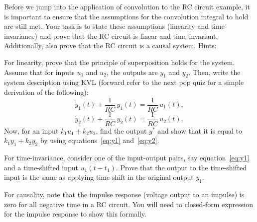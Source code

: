 \documentclass{ee102_notes}
\begin{document}
\begin{popquiz}
    Before we jump into the application of convolution to the RC circuit example, it is important to ensure that the assumptions for the convolution integral to hold are still met. Your task is to state these assumptions (linearity and time-invariance) and prove that the RC circuit is linear and time-invariant. Additionally, also prove that the RC circuit is a causal system.
    \popqsplit
    Hints:
    
    For linearity, prove that the principle of superposition holds for the system. Assume that for inputs $u_1$ and $u_2$, the outputs are $y_1$ and $y_2$. 
    Then, write the system description using KVL (forward refer to the next pop quiz for a simple derivation of the following):
    \begin{equation}
        \label{eq:y1}
    \dot y_1(t)+\frac{1}{RC}\,y_1(t)=\frac{1}{RC}\,u_1(t),
    \end{equation}
    \begin{equation}
    \dot y_2(t)+\frac{1}{RC}\,y_2(t)=\frac{1}{RC}\,u_2(t),
    \label{eq:y2}
    \end{equation}
    Now, for an input $k_1u_1 + k_2u_2$, find the output $y^*$ and show that it is equal to $k_1y_1 + k_2y_2$ by using equations~\eqref{eq:y1} and~\eqref{eq:y2}. 

    For time-invariance, consider one of the input-output pairs, say equation~\eqref{eq:y1} and a time-shifted input $u_1(t - t_1)$. Prove that the output to the time-shifted input is the same as applying time-shift in the original output $y_1$.

    For causality, note that the impulse response (voltage output to an impulse) is zero for all negative time in a RC circuit. You will need to closed-form expression for the impulse response to show this formally.
\end{popquiz}
\end{document}
